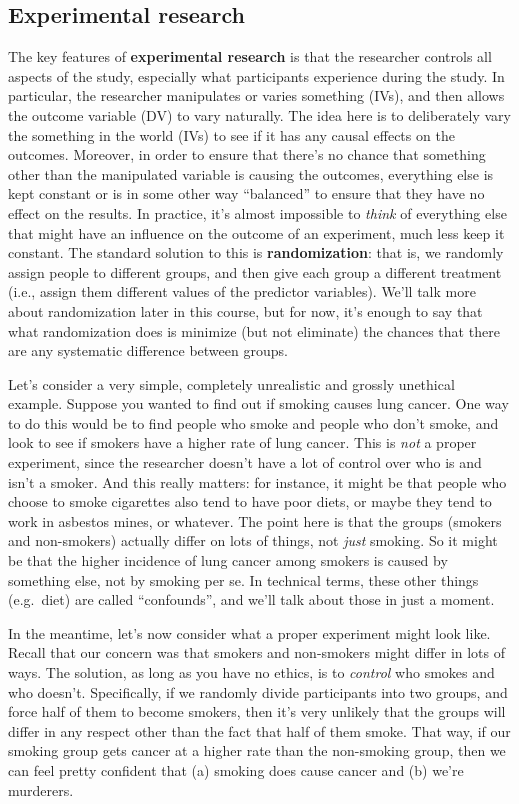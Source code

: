 \documentclass[
]{book}
\begin{document}
\subsection{Experimental research}\label{experimental-research}

The key features of \textbf{experimental research} is that the researcher controls all aspects of the study, especially what participants experience during the study. In particular, the researcher manipulates or varies something (IVs), and then allows the outcome variable (DV) to vary naturally. The idea here is to deliberately vary the something in the world (IVs) to see if it has any causal effects on the outcomes. Moreover, in order to ensure that there's no chance that something other than the manipulated variable is causing the outcomes, everything else is kept constant or is in some other way ``balanced'' to ensure that they have no effect on the results. In practice, it's almost impossible to {\emph{think}} of everything else that might have an influence on the outcome of an experiment, much less keep it constant. The standard solution to this is \textbf{randomization}: that is, we randomly assign people to different groups, and then give each group a different treatment (i.e., assign them different values of the predictor variables). We'll talk more about randomization later in this course, but for now, it's enough to say that what randomization does is minimize (but not eliminate) the chances that there are any systematic difference between groups.

Let's consider a very simple, completely unrealistic and grossly unethical example. Suppose you wanted to find out if smoking causes lung cancer. One way to do this would be to find people who smoke and people who don't smoke, and look to see if smokers have a higher rate of lung cancer. This is {\emph{not}} a proper experiment, since the researcher doesn't have a lot of control over who is and isn't a smoker. And this really matters: for instance, it might be that people who choose to smoke cigarettes also tend to have poor diets, or maybe they tend to work in asbestos mines, or whatever. The point here is that the groups (smokers and non-smokers) actually differ on lots of things, not {\emph{just}} smoking. So it might be that the higher incidence of lung cancer among smokers is caused by something else, not by smoking per se. In technical terms, these other things (e.g.~diet) are called ``confounds'', and we'll talk about those in just a moment.

In the meantime, let's now consider what a proper experiment might look like. Recall that our concern was that smokers and non-smokers might differ in lots of ways. The solution, as long as you have no ethics, is to {\emph{control}} who smokes and who doesn't. Specifically, if we randomly divide participants into two groups, and force half of them to become smokers, then it's very unlikely that the groups will differ in any respect other than the fact that half of them smoke. That way, if our smoking group gets cancer at a higher rate than the non-smoking group, then we can feel pretty confident that (a) smoking does cause cancer and (b) we're murderers.
\end{document}
